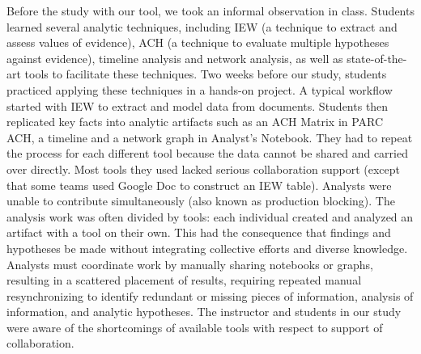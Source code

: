 \documentclass[]{article}
\begin{document}
Before the study with our tool, we took an informal observation in
class. Students learned several analytic techniques, including IEW (a
technique to extract and assess values of evidence), ACH (a technique to
evaluate multiple hypotheses against evidence), timeline analysis and
network analysis, as well as state-of-the-art tools to facilitate these
techniques. Two weeks before our study, students practiced applying
these techniques in a hands-on project. A typical workflow started with
IEW to extract and model data from documents. Students then replicated
key facts into analytic artifacts such as an ACH Matrix in PARC ACH, a
timeline and a network graph in Analyst's Notebook. They had to repeat
the process for each different tool because the data cannot be shared
and carried over directly. Most tools they used lacked serious
collaboration support (except that some teams used Google Doc to
construct an IEW table). Analysts were unable to contribute
simultaneously (also known as production blocking). The analysis work
was often divided by tools: each individual created and analyzed an
artifact with a tool on their own. This had the consequence that
findings and hypotheses be made without integrating collective efforts
and diverse knowledge. Analysts must coordinate work by manually sharing
notebooks or graphs, resulting in a scattered placement of results,
requiring repeated manual resynchronizing to identify redundant or
missing pieces of information, analysis of information, and analytic
hypotheses. The instructor and students in our study were aware of the
shortcomings of available tools with respect to support of
collaboration.

\printbibliography
\end{document}
